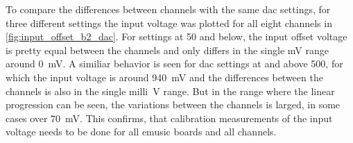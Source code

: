 To compare the differences between channels with the same \ac{dac} settings, for three different settings the input voltage was plotted for all eight channels in \autoref{fig:input_offset_b2_dac}.
For settings at \SI{50}{\dacu} and below, the input offset voltage is pretty equal between the channels and only differs in the single \si{\milli\volt} range around \SI{0}{\milli\volt}.
A similiar behavior is seen for \ac{dac} settings at and above \SI{500}{\dacu}, for which the input voltage is around \SI{940}{\milli\volt} and the differences between the channels is also in the single \si{milli\volt} range.
But in the \si{\dacu} range where the linear progression can be seen, the variations between the channels is larged, in some cases over \SI{70}{\milli\volt}.
This confirms, that calibration measurements of the input voltage needs to be done for all \ac{emusic} boards and all channels.
